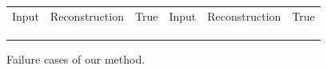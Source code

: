 \documentclass{article}
\newcommand{\fld}{results}
\newcommand{\inc}[1]{\raisebox{-.4\height}{\texttt{[image: \#1]}}}
\newcommand{\w}{2.5cm}
\begin{document}
\newcommand{\diffFTmain}[1]{\fld/00598-recon-real-imagesffhq_test-super-resolution/image#1-target} \newcommand{\diffFOmain}[1]{\fld/00598-recon-real-imagesffhq_test-super-resolution/image#1-corrupted-step5000} \newcommand{\diffFDmain}[1]{\fld/00598-recon-real-imagesffhq_test-super-resolution/image#1-diff} 

\newcommand{\nrDmain}{0017}

\renewcommand{\w}{2.4cm}


\begin{figure}
\centering
\setlength{\tabcolsep}{0pt}
\begin{tabular}{ccc||ccc}\arrayrulecolor{white}
Input & Reconstruction & True & Input & Reconstruction & True\\
 \inc{\fai{\nrFA}} & \inc{\fao{\nrFA}} & \inc{\fat{\nrFA}} &\inc{\fai{\nrFAtwo}} & \inc{\fao{\nrFAtwo}} & \inc{\fat{\nrFAtwo}}\\
 
 \inc{\fai{\nrFAth}} & \inc{\fao{\nrFAth}} & \inc{\fat{\nrFAth}} & \inc{\fai{\nrFAfo}} & \inc{\fao{\nrFAfo}} & \inc{\fat{\nrFAfo}}\\
 
 \inc{\fai{\nrFAfi}} & \inc{\fao{\nrFAfi}} & \inc{\fat{\nrFAfi}} & \inc{\fai{\nrFAsi}} & \inc{\fao{\nrFAsi}} & \inc{\fat{\nrFAsi}}\\

\end{tabular}
\caption{Failure cases of our method.}
\label{failure}
\end{figure}
\end{document}
